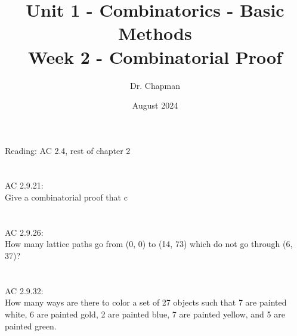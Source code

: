 \documentclass{article}
\title{Unit 1 - Combinatorics - Basic Methods\\ Week 2 - Combinatorial Proof}
\author{Dr. Chapman}
\date{August 2024}
\begin{document}
\maketitle
Reading: AC 2.4, rest of chapter 2
\section{}
AC 2.9.21:\\
Give a combinatorial proof that c\\
\section{}
AC 2.9.26:\\
How many lattice paths go from (0, 0) to (14, 73) which do not go through (6, 37)?
\section{}
AC 2.9.32:\\
How many ways are there to color a set of 27 objects such that 7 are painted white, 6 are painted gold, 2
are painted blue, 7 are painted yellow, and 5 are painted green.
\end{document}
